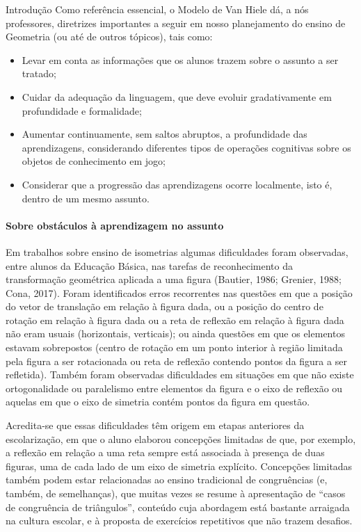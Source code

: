 \begin{apresentacao}{Introdução}
Como referência essencial, o Modelo de Van Hiele dá, a nós professores, diretrizes importantes a seguir em nosso planejamento do ensino de Geometria (ou até de outros tópicos), tais como: 

\begin{itemize}[itemsep=0pt, topsep=0pt]
\item Levar em conta as informações que os alunos trazem sobre o assunto a ser tratado;
\item Cuidar da adequação da linguagem, que deve evoluir gradativamente em profundidade e formalidade;
\item Aumentar continuamente, sem saltos abruptos, a profundidade das aprendizagens, considerando diferentes tipos de operações cognitivas sobre os objetos de conhecimento em jogo;
\item Considerar que a progressão das aprendizagens ocorre localmente, isto é, dentro de um mesmo assunto.
\end{itemize}

\paragraph{Sobre obstáculos à aprendizagem no assunto}
Em trabalhos sobre ensino de isometrias algumas dificuldades foram observadas, entre alunos da Educação Básica, nas tarefas de reconhecimento da transformação geométrica aplicada a uma figura \citep[Bautier, 1986\footnote{falta a referência}][]{grenier1988,cona2017} (Bautier, 1986; Grenier, 1988; Cona, 2017).  Foram identificados erros recorrentes nas questões em que a posição do vetor de translação em relação à figura dada, ou a posição do centro de rotação em relação à figura dada ou{} a reta de reflexão em relação à figura dada não eram usuais (horizontais, verticais); ou ainda questões em que os elementos estavam sobrepostos (centro de rotação em um ponto interior à região limitada pela figura a ser rotacionada ou reta de reflexão contendo pontos da figura a ser refletida).  Também foram observadas dificuldades em situações em que não existe ortogonalidade ou paralelismo entre elementos da figura e o eixo de reflexão ou aquelas em que o eixo de simetria contém pontos da figura em questão.

Acredita-se que essas dificuldades têm origem em etapas anteriores da escolarização, em que o aluno elaborou concepções limitadas de que, por exemplo, a reflexão em relação a uma reta sempre está associada à presença de duas figuras, uma de cada lado de um eixo de simetria explícito. Concepções limitadas também podem estar relacionadas ao ensino tradicional de congruências (e, também, de semelhanças), que muitas vezes se resume à apresentação de “casos de congruência de triângulos”, conteúdo cuja abordagem está bastante arraigada na cultura escolar, e à proposta de exercícios repetitivos que não trazem desafios. 


\end{apresentacao}

